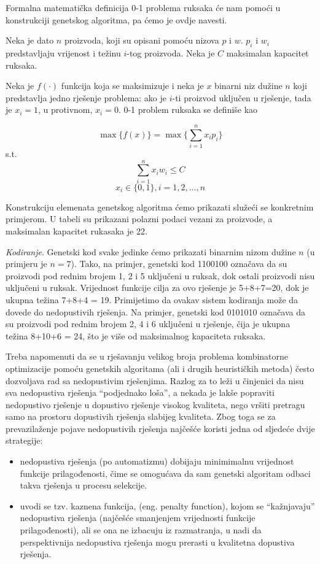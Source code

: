 \documentclass[a4paper, utf8, 11pt, colorlinks]{book}
\begin{document}
Formalna matematička definicija 0-1 problema ruksaka će nam pomoći u konstrukciji genetskog algoritma, pa ćemo je ovdje navesti.

Neka je dato $n$ proizvoda, koji su opisani pomoću nizova $p$ i $w$. $p_i$ i $w_i$ predstavljaju vrijenost i težinu $i$-tog proizvoda. Neka je $C$ maksimalan kapacitet ruksaka.

Neka je $f(\cdot)$ funkcija koja se maksimizuje i neka je $x$ binarni niz dužine $n$ koji predstavlja jedno rješenje problema: ako je $i$-ti proizvod uključen u rješenje, tada je $x_i = 1$, u protivnom, $x_i =0$. 0-1 problem ruksaka se definiše kao

$$\max \{f(x)\} = \max \{\sum_{i=1}^{n}x_ip_i\}$$
s.t.
$$\sum_{i=1}^{n}x_iw_i\leqslant C$$
$$x_i\in\{0,1\}, i = 1,2,...,n$$

Konstrukciju elemenata genetskog algoritma ćemo prikazati služeći se konkretnim primjerom. U tabeli su prikazani polazni podaci vezani za proizvode, a maksimalan kapacitet rukasaka je 22. 

\emph{Kodiranje}. Genetski kod svake jedinke ćemo prikazati binarnim nizom dužine $n$ (u primjeru je $n=7$). Tako, na primjer, genetski kod 1100100 označava da su proizvodi pod rednim brojem 1, 2 i 5 uključeni u ruksak, dok ostali proizvodi nisu uključeni u ruksak. Vrijednost funkcije cilja za ovo rješenje je 5+8+7=20, dok je ukupna težina 7+8+4 = 19. 
Primijetimo da ovakav sistem kodiranja može da dovede do nedopustivih rješenja. Na primjer, genetski kod 0101010 označava da su proizvodi pod rednim brojem 2, 4 i 6 uključeni u rješenje, čija je ukupna težina 8+10+6 = 24, što je više od maksimalnog kapaciteta ruksaka.

Treba napomenuti da se u rješavanju velikog broja problema kombinatorne optimizacije pomoću genetskih algoritama (ali i drugih heurističkih metoda) često dozvoljava rad sa nedopustivim rješenjima. Razlog za to leži u činjenici da nisu sva nedopustiva rješenja ``podjednako loša'', a nekada je lakše popraviti nedopustivo rješenje u dopustivo rješenje visokog kvaliteta, nego vršiti pretragu samo na prostoru dopustivih rješenja slabijeg kvaliteta.  Zbog toga se za prevazilaženje pojave nedopustivih rješenja najčešće koristi jedna od sljedeće dvije strategije: 
\begin{itemize}
	\item
	nedopustiva rješenja (po automatizmu) dobijaju minimimalnu vrijednost funkcije prilagođenosti, čime se omogućava da sam genetski algoritam odbaci takva rješenja u procesu selekcije. 
	
	\item uvodi se tzv. kaznena funkcija, (eng. penalty function), kojom se ``kažnjavaju'' nedopustiva rješenja (najčešće smanjenjem vrijednosti funkcije prilagođenosti), ali se ona ne izbacuju iz razmatranja, u nadi da perspektivnija nedopustiva rješenja mogu prerasti u kvalitetna dopustiva rješenja.
\end{itemize}
\end{document}
